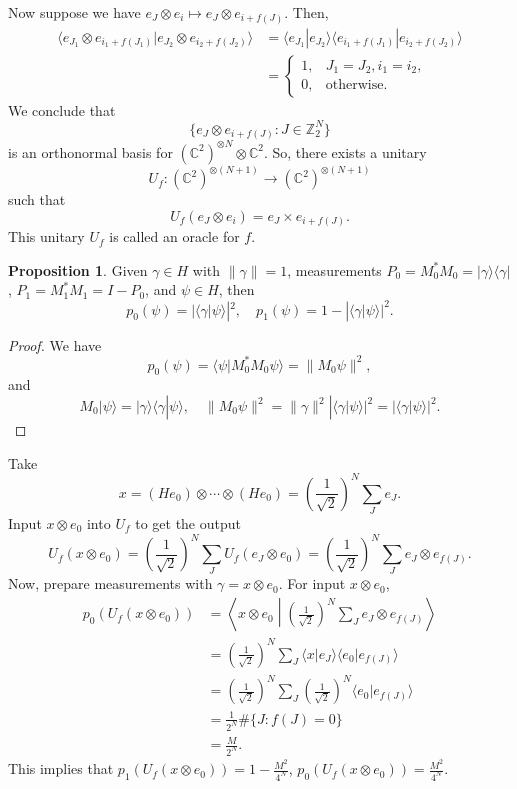 \documentclass[12pt]{article}
\theoremstyle{definition}
\newtheorem*{proposition}{Proposition}
\newcommand{\ket}[1]{|#1\rangle}
\newcommand{\ketbra}[2]{|#1\rangle\langle #2|}
\newcommand{\C}{\mathbb{C}}
\newcommand{\Z}{\mathbb{Z}}
\begin{document}
Now suppose we have $e_J \otimes e_i \mapsto e_J \otimes e_{i+f(J)}$. Then,
\begin{align*}
\langle e_{J_1} \otimes e_{i_1+f(J_1)} | e_{J_2} \otimes e_{i_2+f(J_2)} \rangle &= \langle e_{J_1}|e_{J_2}\rangle \langle e_{i_1+f(J_1)}|e_{i_2+f(J_2)}\rangle \\
&= \begin{cases}1, & J_1 = J_2, i_1 = i_2,\\0, & \text{otherwise.}\end{cases}
\end{align*}
We conclude that
\[
\{e_J \otimes e_{i+f(J)} : J \in \Z_2^N\}
\]
is an orthonormal basis for $(\C^2)^{\otimes N} \otimes \C^2$. So, there exists a unitary
\[
U_f : (\C^2)^{\otimes (N+1)} \to (\C^2)^{\otimes (N+1)}
\]
such that
\[
U_f(e_J \otimes e_i) = e_J \times e_{i+f(J)}.
\]
This unitary $U_f$ is called an oracle for $f$.

\begin{proposition}
Given $\gamma \in H$ with $\|\gamma\| = 1$, measurements $P_0 = M_0^*M_0 = \ketbra{\gamma}{\gamma}$, $P_1 = M_1^*M_1 = I - P_0$, and $\psi \in H$, then
\[
p_0(\psi) = |\langle \gamma|\psi\rangle|^2, \quad p_1(\psi) = 1 - |\langle \gamma|\psi\rangle|^2.
\]
\end{proposition}

\begin{proof}
We have
\[
p_0(\psi) = \langle\psi|M_0^*M_0\psi\rangle = \|M_0\psi\|^2,
\]
and
\[
M_0\ket{\psi} = \ket{\gamma}\langle\gamma|\psi\rangle, \quad \|M_0\psi\|^2 = \|\gamma\|^2 |\langle\gamma|\psi\rangle|^2 = |\langle\gamma|\psi\rangle|^2.
\]
\end{proof}

Take
\[
x = (He_0) \otimes \cdots \otimes (He_0) = \left(\frac{1}{\sqrt{2}}\right)^N \sum_J e_J.
\]
Input $x \otimes e_0$ into $U_f$ to get the output
\[
U_f(x \otimes e_0) = \left(\frac{1}{\sqrt{2}}\right)^N \sum_J U_f(e_J \otimes e_0) = \left(\frac{1}{\sqrt{2}}\right)^N \sum_J e_J \otimes e_{f(J)}.
\]
Now, prepare measurements with $\gamma = x \otimes e_0$. For input $x \otimes e_0$,
\begin{align*}
p_0(U_f(x \otimes e_0)) &= \left\langle x \otimes e_0 \middle| \left(\frac{1}{\sqrt{2}}\right)^N \sum_J e_J \otimes e_{f(J)} \right\rangle \\
&= \left(\frac{1}{\sqrt{2}}\right)^N \sum_J \langle x|e_J\rangle \langle e_0|e_{f(J)}\rangle \\
&= \left(\frac{1}{\sqrt{2}}\right)^N \sum_J \left(\frac{1}{\sqrt{2}}\right)^N \langle e_0|e_{f(J)}\rangle \\
&= \frac{1}{2^N} \#\{J : f(J) = 0\} \\
&= \frac{M}{2^N}.
\end{align*}
This implies that $p_1(U_f(x \otimes e_0)) = 1 - \frac{M^2}{4^N}$, $p_0(U_f(x \otimes e_0)) = \frac{M^2}{4^N}$.
\end{document}
